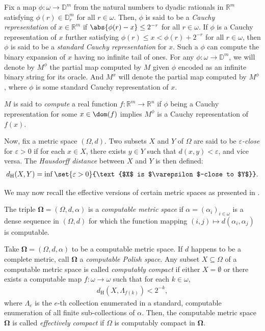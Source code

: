 Fix a map $\phi : \omega \to \mathbb{D}^m$ from the natural numbers to dyadic rationals in $\mathbb{R}^m$ satisfying $\phi(r) \in \mathbb{D}^m_r$ for all $r \in \omega$. Then, $\phi$ is said to be a \textit{Cauchy representation} of $x \in \mathbb{R}^m$ if $\abs{\phi(r) - x} \leq 2^{-r}$ for all $r \in \omega$. If $\phi$ is a Cauchy representation of $x$ further satisfying $\phi(r) \leq x < \phi(r) + 2^{-r}$ for all $r \in \omega$, then $\phi$ is said to be a \textit{standard Cauchy representation} for $x$. Such a $\phi$ can compute the binary expansion of $x$ having no infinite tail of ones. For any $\phi: \omega \to \mathbb{D}^m$, we will denote by $M^\phi$ the partial map computed by $M$ given $\phi$ encoded as an infinite binary string for its oracle. And $M^x$ will denote the partial map computed by $M^\phi$, where $\phi$ is some standard Cauchy representation of $x$. 

$M$ is said to \textit{compute} a real function $f: \mathbb{R}^m \to \mathbb{R}^n$ if $\phi$ being a Cauchy representation for some $x \in \dom(f)$ implies $M^\phi$ is a Cauchy representation of $f(x)$.

Now, fix a metric space $(\Omega, d)$. Two subsets $X$ and $Y$ of $\Omega$ are said to be \textit{$\varepsilon$-close} for $\varepsilon > 0$ if for each $x \in X$, there exists $y \in Y$ such that $d(x, y) < \varepsilon$, and vice versa. The \textit{Hausdorff distance} between $X$ and $Y$ is then defined:
\begin{align*}
    d_{\operatorname{H}}(X, Y) = \inf \set{\varepsilon > 0}{\text{$X$ is $\varepsilon$-close to $Y$}}.
\end{align*}

We may now recall the effective versions of certain metric spaces as presented in \cite{IK21}. 

The triple $\mathbf{\Omega} = (\Omega, d, \alpha)$ is a \textit{computable metric space} if $\alpha = (\alpha_i)_{i \in \omega}$ is a dense sequence in $(\Omega, d)$ for which the function mapping $(i, j) \mapsto d(\alpha_i, \alpha_j)$ is computable. 

Take $\mathbf{\Omega} = (\Omega, d, \alpha)$ to be a computable metric space. If $d$ happens to be a complete metric, call $\mathbf{\Omega}$ a \textit{computable Polish space}. Any subset $X \subseteq \Omega$ of a computable metric space is called \textit{computably compact} if either $X = \emptyset$ or there exists a computable map $f : \omega \to \omega$ such that for each $k \in \omega$,
\begin{align*}
    d_{\operatorname{H}}(X, \Lambda_{f(k)}) < 2^{-k},
\end{align*}
where $\Lambda_e$ is the $e$-th collection enumerated in a standard, computable enumeration of all finite sub-collections of $\alpha$. Then, the computable metric space $\mathbf{\Omega}$ is called \textit{effectively compact} if $\Omega$ is computably compact in $\mathbf{\Omega}$.

